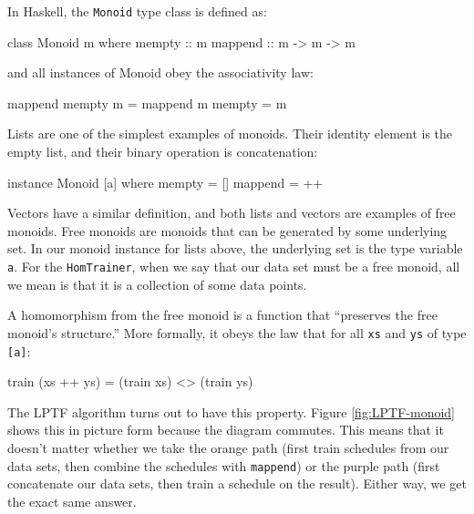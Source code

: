 \documentclass[tikz]{tmr}
\newcommand\h{\lstinline}
\newcommand\+{\mdoubleplus}
\begin{document}
In Haskell, the \h{Monoid} type class is defined as:
\begin{spec}
class Monoid m where
    mempty  :: m
    mappend :: m -> m -> m
\end{spec}
and all instances of Monoid obey the associativity law:
\begin{spec}
mappend mempty m = mappend m mempty = m
\end{spec}
Lists are one of the simplest examples of monoids.
Their identity element is the empty list, and their binary operation is concatenation:
\begin{spec}
instance Monoid [a] where
    mempty = []
    mappend = ++
\end{spec}
Vectors have a similar definition, and both lists and vectors are examples of free monoids.
Free monoids are monoids that can be generated by some underlying set.
In our monoid instance for lists above, the underlying set is the type variable \h{a}.
For the \h{HomTrainer}, when we say that our data set must be a free monoid, all we mean is that it is a collection of some data points.

A homomorphism from the free monoid is a function that ``preserves the free monoid's structure.''
More formally, it obeys the law that for all \lstinline{xs} and \lstinline{ys} of type \lstinline{[a]}:
\begin{spec}
train (xs ++ ys) = (train xs) <> (train ys)
\end{spec}
The LPTF algorithm turns out to have this property.
Figure \ref{fig:LPTF-monoid} shows this in picture form because the diagram commutes.
This means that it doesn't matter whether we take the orange path (first train schedules from our data sets, then combine the schedules with \h{mappend}) or the purple path (first concatenate our data sets, then train a schedule on the result).
Either way, we get the exact same answer.
\end{document}
